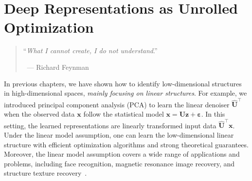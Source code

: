 \documentclass[../../book-main.tex]{subfiles}
\begin{document}
\chapter{Deep Representations as Unrolled Optimization}
\label{ch:representation}
\label{ch:unrolling}

\begin{quote}
\hfill    ``{\em What I cannot create, I do not understand}.''

$~$ \hfill --- Richard Feynman   
\end{quote}
\vspace{5mm}




In previous chapters, we have shown how to identify low-dimensional structures in high-dimensional spaces, \textit{mainly focusing on linear structures}. 
For example, we introduced principal component analysis (PCA) to learn the linear denoiser $\hat{\bm{U}}^{\top}$ when the observed data $\bm{x}$ follow the statistical model $\bm{x} = \bm{U}\bm{z} + \bm{\varepsilon}$. 
In this setting, the learned representations are linearly transformed input data $\hat{\bm{U}}^{\top}\bm{x}$.
Under the linear model assumption, one can learn the low-dimensional linear structure with efficient optimization algorithms and strong theoretical guarantees. 
Moreover, the linear model assumption covers a wide range of applications and problems, including face recognition, magnetic resonance image recovery, and structure texture recovery~\cite{Wright-Ma-2022}.
\end{document}
